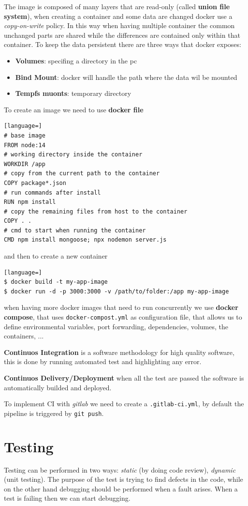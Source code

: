 \documentclass[12pt]{article}
\begin{document}
The image is composed of many layers that are read-only (called \textbf{union file system}), when creating a container and some data are changed docker use a \emph{copy-on-write} policy. In this way when having multiple container the common unchanged parts are shared while the differences are contained only within that container. To keep the data persistent there are three ways that docker exposes:
\begin{itemize}
  \item \textbf{Volumes}: specifing a directory in the pc
  \item \textbf{Bind Mount}: docker will handle the path where the data wil be mounted
  \item \textbf{Tempfs muonts}: temporary directory
\end{itemize}
To create an image we need to use \textbf{docker file}
\begin{lstlisting}[language=]
# base image
FROM node:14
# working directory inside the container
WORKDIR /app
# copy from the current path to the container
COPY package*.json
# run commands after install
RUN npm install
# copy the remaining files from host to the container
COPY . .
# cmd to start when running the container
CMD npm install mongoose; npx nodemon server.js
\end{lstlisting}
and then to create a new container
\begin{lstlisting}[language=]
$ docker build -t my-app-image
$ docker run -d -p 3000:3000 -v /path/to/folder:/app my-app-image
\end{lstlisting}
when having more docker images that need to run concurrently we use \textbf{docker compose}, that uses \texttt{docker-compost.yml} as configuration file, that allows us to define environmental variables, port forwarding, dependencies, volumes, the containers, ...

\textbf{Continuos Integration} is a software methodology for high quality software, this is done by running automated test and highlighting any error.

\textbf{Continuos Delivery/Deployment} when all the test are passed the software is automatically builded and deployed.

To implement CI with \emph{gitlab} we need to create a \texttt{.gitlab-ci.yml}, by default the pipeline is triggered by \texttt{git push}.




\newpage
\section{Testing}
Testing can be performed in two ways: \emph{static} (by doing code review), \emph{dynamic} (unit testing). The purpose of the test is trying to find defects in the code, while on the other hand debugging should be performed when a fault arises. When a test is failing then we can start debugging.
\end{document}
